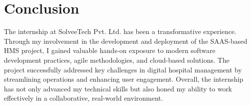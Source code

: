 \section{Conclusion}
The internship at SolveeTech Pvt. Ltd. has been a transformative experience. Through my involvement in the development and deployment of the SAAS-based HMS project, I gained valuable hands-on exposure to modern software development practices, agile methodologies, and cloud-based solutions. The project successfully addressed key challenges in digital hospital management by streamlining operations and enhancing user engagement. Overall, the internship has not only advanced my technical skills but also honed my ability to work effectively in a collaborative, real-world environment.
